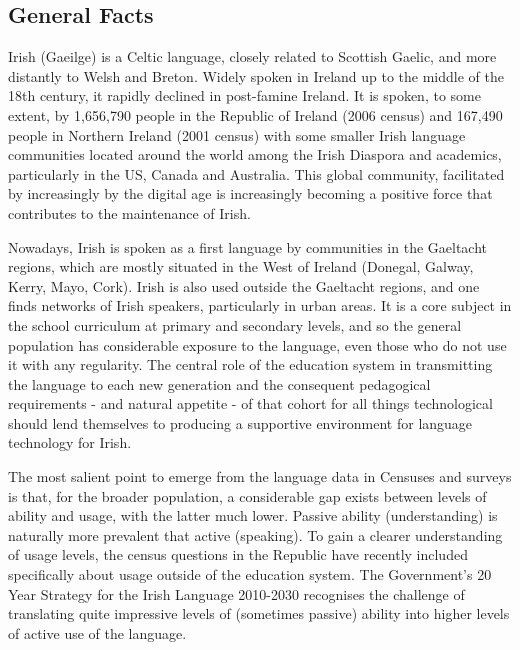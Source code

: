 \clearpage

\label{IrishInfso_en}

\begin{multicols}{2}

\subsection{General Facts}

Irish (Gaeilge) is a Celtic language, closely related to Scottish Gaelic, and more distantly to Welsh and Breton. Widely spoken in Ireland up to the middle of the 18th century, it rapidly declined in post-famine Ireland. It is spoken, to some extent, by 1,656,790 people in the Republic of Ireland (2006 census) and 167,490 people in Northern Ireland (2001 census) with some smaller Irish language communities located around the world among the Irish Diaspora and academics, particularly in the US, Canada and Australia. This global community, facilitated by increasingly by the digital age is increasingly becoming a positive force that contributes to the maintenance of Irish. 

Nowadays,  Irish is spoken as a first language by communities in the Gaeltacht regions, which are mostly situated in the West of Ireland (Donegal, Galway, Kerry, Mayo, Cork). Irish is also used outside the Gaeltacht regions, and one finds networks of Irish speakers, particularly in urban areas.   It is a core subject in the school curriculum at primary and secondary levels, and so the general population has considerable exposure to the language, even those who do not use it with any regularity. The central role of the education system in transmitting the language to each new generation \cite{oriagain97} and the consequent pedagogical requirements - and natural appetite - of that cohort for all things technological should lend themselves to producing a supportive environment for language technology for Irish.

The most salient point to emerge from the language data in Censuses and surveys is that, for the broader population, a considerable gap exists between levels of ability and usage, with the latter much lower. Passive ability (understanding) is naturally more prevalent that active (speaking). To gain a clearer understanding of usage levels, the census questions in the Republic have recently included specifically about usage outside of the education system. The Government's 20 Year Strategy for the Irish Language 2010-2030 recognises the challenge of translating quite impressive levels of (sometimes passive) ability into higher levels of active use of the language.


\end{multicols}
